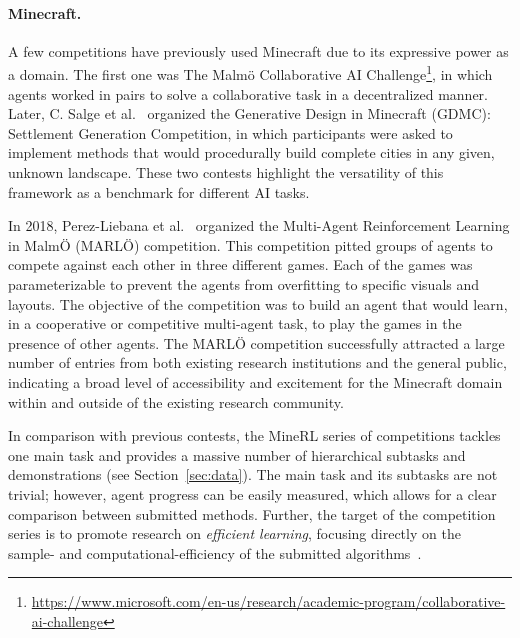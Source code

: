 \paragraph{Minecraft.} 
A few competitions have previously used Minecraft due to its expressive power as a domain. 
The first one was The Malm\"{o} Collaborative AI Challenge\footnote{\url{https://www.microsoft.com/en-us/research/academic-program/collaborative-ai-challenge}}, in which agents worked in pairs to solve a collaborative task in a decentralized manner. 
Later, C. Salge et al.~\cite{salge2018generative} organized the Generative Design in Minecraft (GDMC): Settlement Generation Competition, in which participants were asked to implement methods that would procedurally build complete cities in any given, unknown landscape. 
These two contests highlight the versatility of this framework as a benchmark for different AI tasks.

In 2018, Perez-Liebana et al.~\cite{perez2019multi} organized the Multi-Agent Reinforcement Learning in Malm\"{O} (MARL\"{O}) competition. 
This competition pitted groups of agents to compete against each other in three different games.
Each of the games was parameterizable to prevent the agents from overfitting to specific visuals and layouts. 
The objective of the competition was to build an agent that would learn, in a cooperative or competitive multi-agent task, to play the games in the presence of other agents. 
The MARL\"{O} competition successfully attracted a large number of entries from both existing research institutions and the general public, indicating a broad level of accessibility and excitement for the Minecraft domain within and outside of the existing research community.

In comparison with previous contests, the MineRL series of competitions tackles one main task and provides a massive number of hierarchical subtasks and demonstrations (see Section~\ref{sec:data}). 
The main task and its subtasks are not trivial; however, agent progress can be easily measured, which allows for a clear comparison between submitted methods. 
Further, the target of the competition series is to promote research on \textit{efficient learning}, focusing directly on the sample- and computational-efficiency of the submitted algorithms~\cite{houghton2020guaranteeing}.
